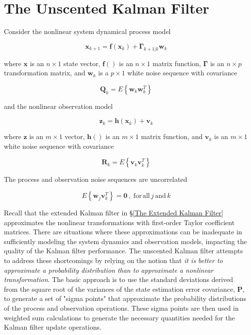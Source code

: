 \section{The Unscented Kalman Filter}
\label{The Unscented Kalman Filter}

Consider the nonlinear system dynamical process model

\begin{equation*}
    \mathbf{x}_{k+1} = \mathbf{f} \left( \mathbf{x}_k \right) + \mathbf{\Gamma}_{k+1|k} \mathbf{w}_k
\end{equation*}

where $\mathbf{x}$ is an $n \times 1$ state vector, $\mathbf{f}()$ is an $n \times 1$
matrix function, $\mathbf{\Gamma}$ is an $n \times p$ transformation matrix, and $\mathbf{w}_k$
is a $p \times 1$ white noise sequence with covariance

\begin{equation*}
    \mathbf{Q}_k = E \left\{ \mathbf{w}_k \mathbf{w}_k^T \right\}
\end{equation*}

and the nonlinear observation model

\begin{equation*}
    \mathbf{z}_k = \mathbf{h} \left( \mathbf{x}_k \right) + \mathbf{v}_k
\end{equation*}

where $\mathbf{z}$ is an $m \times 1$ vector, $\mathbf{h}()$ is an $m \times 1$ matrix
function, and $\mathbf{v}_k$ is an $m \times 1$ white noise sequence with covariance

\begin{equation*}
    \mathbf{R}_k = E \left\{ \mathbf{v}_k \mathbf{v}_k^T \right\}
\end{equation*}

The process and observation noise sequences are uncorrelated

\begin{equation*}
    E \left\{ \mathbf{w}_j \mathbf{v}_k^T \right\} = \mathbf{0} \, , \phantom{.} \mathrm{for} \, \mathrm{all} \, j \, \mathrm{and} \, k
\end{equation*}

Recall that the extended Kalman filter in \S\ref{The Extended Kalman Filter} approximates
the nonlinear transformations with first-order Taylor coefficient matrices. There are
situations where these approximations can be inadequate in sufficiently modeling the
system dynamics and observation models, impacting the quality of the Kalman filter
performance. The unscented Kalman filter attempts to address these shortcomings by
relying on the notion that
\textit{it is better to approximate a probability distribution than to approximate a nonlinear transformation}.
The basic approach is to use the standard deviations derived from the square root of the
variances of the state estimation error covariance, $\mathbf{P}$, to generate a set of
"sigma points" that approximate the probability distributions of the process and
observation operations. These sigma points are then used in weighted sum calculations
to generate the necessary quantities needed for the Kalman filter update operations.

